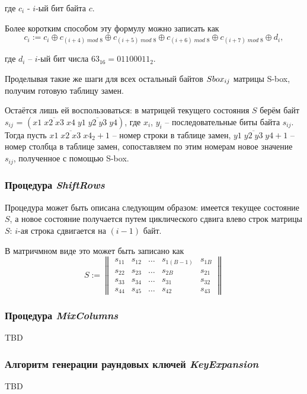     где $c_{i}$ - $i$-ый бит байта $c$.

    Более коротким способом эту формулу можно записать как
    \begin{equation}
        c_{i} := c_{i} \oplus c_{(i + 4) \; mod \; 8} \oplus c_{(i + 5) \; mod \; 8} \oplus c_{(i + 6) \; mod \; 8}
        \oplus c_{(i + 7) \; mod \; 8} \oplus d_{i},
    \end{equation}

    где $d_{i}$ -- $i$-ый бит числа $63_{16} = 01100011_{2}$.

    Проделывая такие же шаги для всех остальный байтов $S\-box_{ij}$ матрицы S-box, получим готовую таблицу замен.

    Остаётся лишь ей воспользоваться: в матрицей текущего состояния $S$ берём байт
    $s_{ij}$ = $(\overline{x1 \; x2 \; x3 \; x4} \; \overline{y1 \; y2 \; y3 \; y4})$, где $x_{i}$, $y_{i}$ -- последовательные
    биты байта $s_{ij}$. Тогда пусть $\overline{x1 \; x2 \; x3 \; x4}_2 + 1$ -- номер строки в таблице замен,
    $\overline{y1 \; y2 \; y3 \; y4} + 1$ -- номер столбца в таблице замен, сопоставляем по этим номерам новое значение
    $s_{ij}$, полученное с помощью S-box.

\subsubsection{Процедура \textit{ShiftRows}} \label{ShiftRows}

    Процедура может быть описана следующим образом: имеется текущее состояние $S$, а новое состояние
    получается путем циклического сдвига влево строк матрицы $S$: $i$-ая строка сдвигается на $(i - 1)$
    байт.

    В матричмном виде это может быть записано как
    \begin{equation}
        S :=
        \begin{Vmatrix}
            s_{11} & s_{12} & \dots & s_{1(B - 1)} & s_{1B} \\
            s_{22} & s_{23} & \dots & s_{2B} & s_{21} \\
            s_{33} & s_{34} & \dots & s_{31} & s_{32} \\
            s_{44} & s_{45} & \dots & s_{42} & s_{43}
        \end{Vmatrix}
    \end{equation}

\subsubsection{Процедура \textit{MixColumns}} \label{MixColumns}

TBD

\subsubsection{Алгоритм генерации раундовых ключей \textit{KeyExpansion}} \label{KeyExpansion}

TBD
